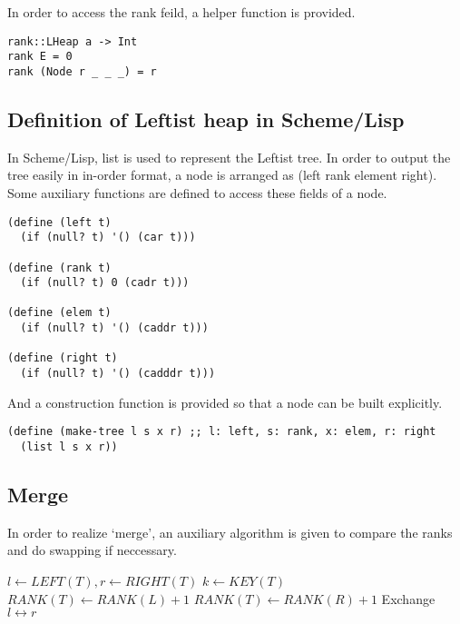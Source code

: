 \documentclass{article}
\begin{document}
In order to access the rank feild, a helper function is provided.

\begin{lstlisting}
rank::LHeap a -> Int
rank E = 0
rank (Node r _ _ _) = r
\end{lstlisting}

\subsection*{Definition of Leftist heap in Scheme/Lisp}

In Scheme/Lisp, list is used to represent the Leftist tree. In order
to output the tree easily in in-order format, a node is arranged as
(left rank element right). Some auxiliary functions are defined 
to access these fields of a node.

\lstset{language=lisp}
\begin{lstlisting}
(define (left t)
  (if (null? t) '() (car t)))

(define (rank t)
  (if (null? t) 0 (cadr t)))

(define (elem t)
  (if (null? t) '() (caddr t)))

(define (right t)
  (if (null? t) '() (cadddr t)))
\end{lstlisting}

And a construction function is provided so that a node can be 
built explicitly.

\begin{lstlisting}
(define (make-tree l s x r) ;; l: left, s: rank, x: elem, r: right
  (list l s x r))
\end{lstlisting}

\subsection{Merge}

In order to realize `merge', an auxiliary algorithm is given to 
compare the ranks and do swapping if neccessary.

\begin{algorithmic}[1]
  \State $l \gets LEFT(T), r \gets RIGHT(T)$
  \State $k \gets KEY(T)$
    \State $RANK(T) \gets RANK(L) + 1$
  \Else
    \State $RANK(T) \gets RANK(R) + 1$
    \State Exchange $l \leftrightarrow r$
  \EndIf
\EndFunction
\end{algorithmic}
\end{document}
